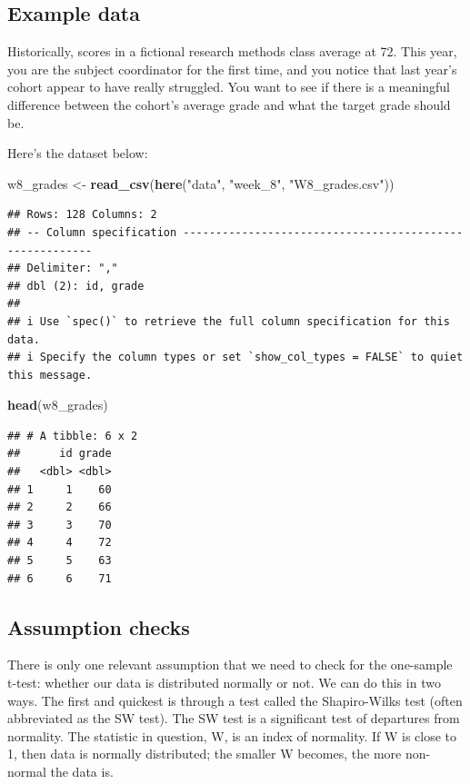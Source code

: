 \documentclass[
]{book}
\newenvironment{Shaded}{\begin{snugshade}}{\end{snugshade}}
\newcommand{\FunctionTok}[1]{\textcolor[rgb]{0.13,0.29,0.53}{\textbf{#1}}}
\newcommand{\NormalTok}[1]{#1}
\newcommand{\OtherTok}[1]{\textcolor[rgb]{0.56,0.35,0.01}{#1}}
\newcommand{\StringTok}[1]{\textcolor[rgb]{0.31,0.60,0.02}{#1}}
\begin{document}
\hypertarget{example-data}{%
\subsection{Example data}\label{example-data}}

Historically, scores in a fictional research methods class average at 72. This year, you are the subject coordinator for the first time, and you notice that last year's cohort appear to have really struggled. You want to see if there is a meaningful difference between the cohort's average grade and what the target grade should be.

Here's the dataset below:

\begin{Shaded}
\begin{Highlighting}[]
\NormalTok{w8\_grades }\OtherTok{\textless{}{-}} \FunctionTok{read\_csv}\NormalTok{(}\FunctionTok{here}\NormalTok{(}\StringTok{"data"}\NormalTok{, }\StringTok{"week\_8"}\NormalTok{, }\StringTok{"W8\_grades.csv"}\NormalTok{))}
\end{Highlighting}
\end{Shaded}

\begin{verbatim}
## Rows: 128 Columns: 2
## -- Column specification --------------------------------------------------------
## Delimiter: ","
## dbl (2): id, grade
## 
## i Use `spec()` to retrieve the full column specification for this data.
## i Specify the column types or set `show_col_types = FALSE` to quiet this message.
\end{verbatim}

\begin{Shaded}
\begin{Highlighting}[]
\FunctionTok{head}\NormalTok{(w8\_grades)}
\end{Highlighting}
\end{Shaded}

\begin{verbatim}
## # A tibble: 6 x 2
##      id grade
##   <dbl> <dbl>
## 1     1    60
## 2     2    66
## 3     3    70
## 4     4    72
## 5     5    63
## 6     6    71
\end{verbatim}

\hypertarget{assumption-checks}{%
\subsection{Assumption checks}\label{assumption-checks}}

There is only one relevant assumption that we need to check for the one-sample t-test: whether our data is distributed normally or not. We can do this in two ways. The first and quickest is through a test called the Shapiro-Wilks test (often abbreviated as the SW test). The SW test is a significant test of departures from normality. The statistic in question, W, is an index of normality. If W is close to 1, then data is normally distributed; the smaller W becomes, the more non-normal the data is.
\end{document}
